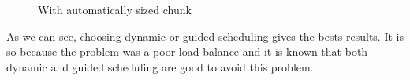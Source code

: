 \begin{figure}[!h]
  \begin{center}
  \end{center}
  \caption{With automatically sized chunk}
  \label{opt}
\end{figure}

As we can see, choosing dynamic or guided scheduling gives the bests results. It is so because the problem was a poor load balance and it is known that both dynamic and guided scheduling are good to avoid this problem.
